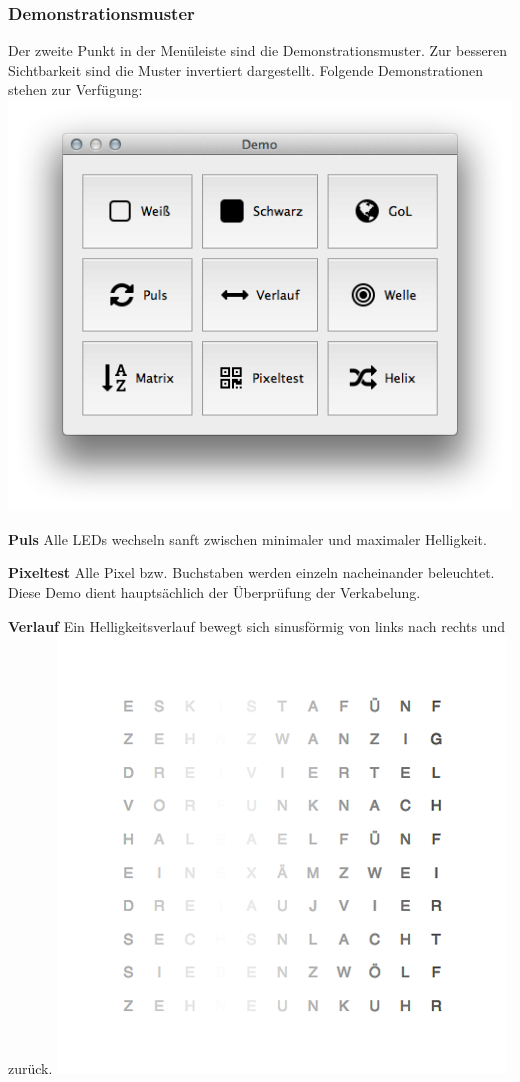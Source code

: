 \begin{multicols}{2}
\subsubsection{Demonstrationsmuster}
Der zweite Punkt in der Menüleiste sind die Demonstrationsmuster.
Zur besseren Sichtbarkeit sind die Muster invertiert dargestellt.
Folgende Demonstrationen stehen zur Verfügung:
\includegraphics[width=\columnwidth]{Abbildungen/Software/Demos}

\textbf{Puls}
Alle LEDs wechseln sanft zwischen minimaler und maximaler Helligkeit.

\textbf{Pixeltest}
Alle Pixel bzw. Buchstaben werden einzeln nacheinander beleuchtet. Diese Demo dient hauptsächlich der Überprüfung der Verkabelung.

\textbf{Verlauf}
Ein Helligkeitsverlauf bewegt sich sinusförmig von links nach rechts und zurück.
\includegraphics[width=\columnwidth]{Abbildungen/Software/Demo/Fade}


\end{multicols}
